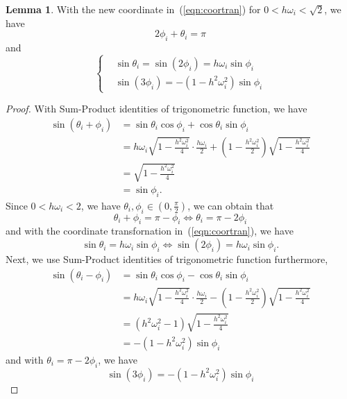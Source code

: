 \documentclass[11pt,fceqn]{article}
\numberwithin{equation}{section}
\theoremstyle{definition}
\newtheorem{lem}[thm]{Lemma}
\begin{document}
\begin{lem}
\label{lem:coorpro}
With the new coordinate in~(\ref{eqn:coortran}) for $0 < h\omega_{i} < \sqrt{2}$, we have 
\begin{equation}
\label{eqn:thetaphi}
2\phi_{i} + \theta_{i} = \pi
\end{equation}
and
\begin{equation}
\label{eqn:coorpro}
\left\{\begin{aligned}
       & \sin\theta_{i}  = \sin(2\phi_{i}) = h\omega_{i} \sin\phi_{i}\\
       & \sin(3\phi_{i}) = - \left(1 - h^{2}\omega_{i}^{2}\right)\sin\phi_{i}
       \end{aligned}\right. 
\end{equation} 
\end{lem}
\begin{proof}
With Sum-Product identities of trigonometric function, we have 
$$
\begin{aligned}
\sin(\theta_{i} + \phi_{i}) & = \sin\theta_{i} \cos\phi _{i}+ \cos\theta_{i} \sin\phi_{i} \\
                            & = h\omega_{i}\sqrt{1 - \frac{h^{2}\omega_{i}^{2}}{4}} \cdot \frac{h\omega_{i}}{2} + \left(1-\frac{h^{2}\omega_{i}^{2}}{2}\right) \sqrt{1 - \frac{h^{2}\omega_{i}^{2}}{4}}\\
                            & = \sqrt{1 - \frac{h^{2}\omega_{i}^{2}}{4}}\\
                            & = \sin\phi_{i}.
\end{aligned}
$$
Since $0< h\omega_{i} < 2$, we have $\theta_{i}, \phi_{i} \in \left(0, \frac{\pi}{2}\right)$, we can obtain that 
$$
\theta_{i} + \phi_{i} = \pi - \phi_{i} \Leftrightarrow \theta_{i} = \pi - 2\phi_{i}
$$
and with the coordinate transfornation in~(\ref{eqn:coortran}), we have
$$
\sin\theta_{i} = h\omega_{i} \sin\phi_{i} \Leftrightarrow \sin(2\phi_{i}) = h\omega_{i} \sin\phi_{i}.
$$
Next, we use Sum-Product identities of trigonometric function furthermore, 
$$
\begin{aligned}
\sin(\theta_{i} - \phi_{i}) & = \sin\theta_{i} \cos\phi _{i}- \cos\theta_{i} \sin\phi_{i} \\
                            & = h\omega_{i}\sqrt{1 - \frac{h^{2}\omega_{i}^{2}}{4}} \cdot \frac{h\omega_{i}}{2} - \left(1-\frac{h^{2}\omega_{i}^{2}}{2}\right) \sqrt{1 - \frac{h^{2}\omega_{i}^{2}}{4}}\\
                            & = \left(h^{2}\omega_{i}^{2}-1\right)\sqrt{1 - \frac{h^{2}\omega_{i}^{2}}{4}}\\
                            & = -\left(1-h^{2}\omega_{i}^{2}\right) \sin\phi_{i}
\end{aligned}
$$
and with $\theta_{i} = \pi - 2\phi_{i}$, we have
$$
\sin(3\phi_{i}) = -\left(1-h^{2}\omega_{i}^{2}\right) \sin\phi_{i}
$$
\end{proof}
\end{document}

